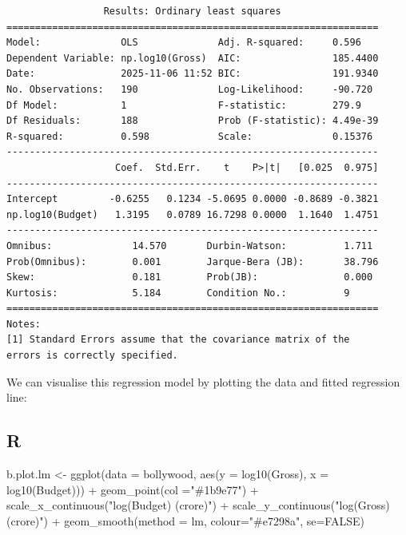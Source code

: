 \documentclass[
  a4paper,
  DIV=11,
  numbers=noendperiod]{scrreprt}
\newenvironment{Shaded}{\begin{snugshade}}{\end{snugshade}}
\newcommand{\AttributeTok}[1]{\textcolor[rgb]{0.40,0.45,0.13}{#1}}
\newcommand{\ConstantTok}[1]{\textcolor[rgb]{0.56,0.35,0.01}{#1}}
\newcommand{\FunctionTok}[1]{\textcolor[rgb]{0.28,0.35,0.67}{#1}}
\newcommand{\NormalTok}[1]{\textcolor[rgb]{0.00,0.23,0.31}{#1}}
\newcommand{\OtherTok}[1]{\textcolor[rgb]{0.00,0.23,0.31}{#1}}
\newcommand{\SpecialCharTok}[1]{\textcolor[rgb]{0.37,0.37,0.37}{#1}}
\newcommand{\StringTok}[1]{\textcolor[rgb]{0.13,0.47,0.30}{#1}}
\newenvironment{fbxSimple}[3]{\begin{tcolorbox}[enhanced, breakable,%
attach boxed title to top*={xshift=1.4pt},
boxed title style={boxrule=0.0mm, fuzzy shadow={1pt}{-1pt}{0mm}{0.1mm}{gray}, arc=.3em, rounded corners=east, sharp corners=west}, colframe=#1-color2, colbacktitle=#1-color1, colback = white, coltitle=black,  titlerule=0mm, toprule=0pt, bottomrule=.7pt, leftrule=.3em, rightrule=.7pt, outer arc=.3em,  	left=.5em, right=.5em, bottomtitle=1mm, toptitle=1mm,title=\textbf{#2}\hspace{0.5em}{#3}]}
{\end{tcolorbox}}
\begin{document}
\begin{fbxSimple}{Example}{Example 1: }{Bollywood box office revenue}
\begin{verbatim}
                 Results: Ordinary least squares
=================================================================
Model:              OLS              Adj. R-squared:     0.596   
Dependent Variable: np.log10(Gross)  AIC:                185.4400
Date:               2025-11-06 11:52 BIC:                191.9340
No. Observations:   190              Log-Likelihood:     -90.720 
Df Model:           1                F-statistic:        279.9   
Df Residuals:       188              Prob (F-statistic): 4.49e-39
R-squared:          0.598            Scale:              0.15376 
-----------------------------------------------------------------
                   Coef.  Std.Err.    t    P>|t|   [0.025  0.975]
-----------------------------------------------------------------
Intercept         -0.6255   0.1234 -5.0695 0.0000 -0.8689 -0.3821
np.log10(Budget)   1.3195   0.0789 16.7298 0.0000  1.1640  1.4751
-----------------------------------------------------------------
Omnibus:              14.570       Durbin-Watson:          1.711 
Prob(Omnibus):        0.001        Jarque-Bera (JB):       38.796
Skew:                 0.181        Prob(JB):               0.000 
Kurtosis:             5.184        Condition No.:          9     
=================================================================
Notes:
[1] Standard Errors assume that the covariance matrix of the
errors is correctly specified.
\end{verbatim}

We can visualise this regression model by plotting the data and fitted
regression line:

\subsection{R}

\begin{Shaded}
\begin{Highlighting}[]
\NormalTok{b.plot.lm }\OtherTok{\textless{}{-}} \FunctionTok{ggplot}\NormalTok{(}\AttributeTok{data =}\NormalTok{ bollywood, }\FunctionTok{aes}\NormalTok{(}\AttributeTok{y =} \FunctionTok{log10}\NormalTok{(Gross), }\AttributeTok{x =} \FunctionTok{log10}\NormalTok{(Budget))) }\SpecialCharTok{+}
          \FunctionTok{geom\_point}\NormalTok{(}\AttributeTok{col =}\StringTok{"\#1b9e77"}\NormalTok{) }\SpecialCharTok{+}
          \FunctionTok{scale\_x\_continuous}\NormalTok{(}\StringTok{"log(Budget) (crore)"}\NormalTok{) }\SpecialCharTok{+}
          \FunctionTok{scale\_y\_continuous}\NormalTok{(}\StringTok{"log(Gross) (crore)"}\NormalTok{) }\SpecialCharTok{+}
          \FunctionTok{geom\_smooth}\NormalTok{(}\AttributeTok{method =}\NormalTok{ lm, }\AttributeTok{colour=}\StringTok{"\#e7298a"}\NormalTok{, }\AttributeTok{se=}\ConstantTok{FALSE}\NormalTok{)}
\end{Highlighting}
\end{Shaded}


\end{fbxSimple}
\end{document}
